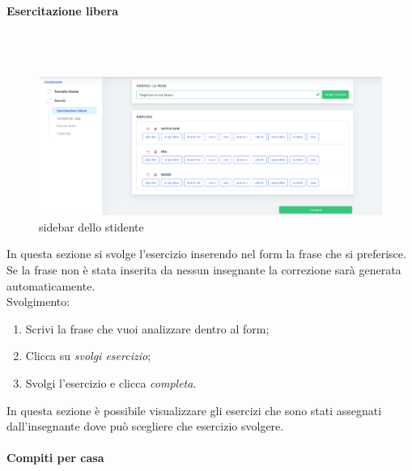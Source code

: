         
               
	\newpage
        \paragraph{Esercitazione libera}\mbox{}\\ \\        
        	\begin{figure}[H]
                \centering
                \includegraphics[width=17cm]{sez/img/studente/esercitazioneLiberaEsegui.PNG} 
                \caption{sidebar dello stidente}\label{fig:1}
        	\end{figure}
          In questa sezione si svolge l'esercizio inserendo nel form la frase che 
        si preferisce. Se la frase non è stata inserita da nessun insegnante la 
        correzione sarà generata automaticamente.
        \\ Svolgimento:
        	\begin{enumerate}        
            	\item Scrivi la frase che vuoi analizzare dentro al form;
            	\item Clicca su \textit{svolgi esercizio};
            	\item Svolgi l'esercizio e clicca \textit{completa}.
        	\end{enumerate}
           In questa sezione è possibile visualizzare gli esercizi che sono stati assegnati dall'insegnante dove può scegliere che esercizio svolgere.
  
        
        
        
        
        
  		\paragraph{Compiti per casa}\mbox{}\\ \\
 
